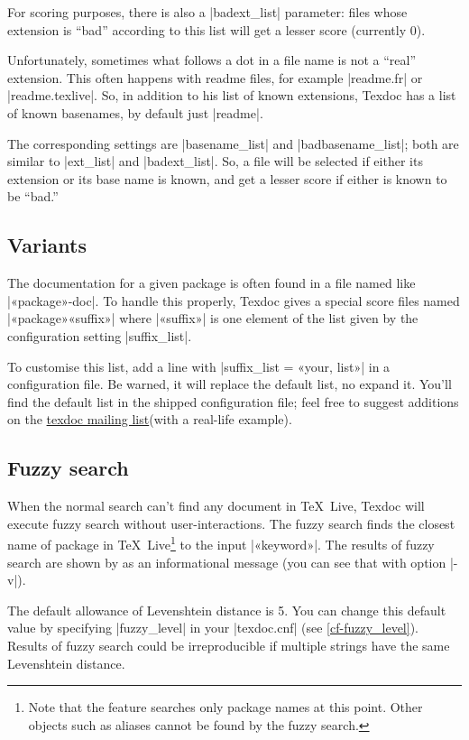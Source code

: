\documentclass[a4paper,oneside]{scrartcl}
\newcommand\texlive{\TeX~Live\xspace}
\newcommand\tdml{\href{http://lists.tug.org/texdoc}{texdoc mailing list}\xspace}
\begin{document}
For scoring purposes, there is also a |badext_list| parameter: files whose
extension is ``bad'' according to this list will get a lesser score (currently
0).

Unfortunately, sometimes what follows a dot in a file name is not a ``real''
extension. This often happens with readme files, for example |readme.fr| or
|readme.texlive|. So, in addition to his list of known extensions, Texdoc has
a list of known basenames, by default just |readme|.

The corresponding settings are |basename_list| and |badbasename_list|; both
are similar to |ext_list| and |badext_list|. So, a file will be selected if
either its extension or its base name is known, and get a lesser score if
either is known to be ``bad.''

\subsection{Variants}\label{ss-variants}

The documentation for a given package is often found in a file named like
|«package»-doc|. To handle this properly, Texdoc gives a special score files
named |«package»«suffix»| where |«suffix»| is one element of the list given by
the configuration setting |suffix_list|.

To customise this list, add a line with |suffix_list = «your, list»| in a
configuration file. Be warned, it will replace the default list, no expand
it. You'll find the default list in the shipped configuration file; feel free
to suggest additions on the \tdml (with a real-life example).

\subsection{Fuzzy search}\label{ss-fuzzy}

When the normal search can't find any document in {\texlive}, Texdoc will
execute fuzzy search without user-interactions. The fuzzy search finds the
closest name of package in {\texlive}\footnote{Note that the feature searches
only package names at this point. Other objects such as aliases cannot be found
by the fuzzy search.} to the input |«keyword»|. The results of fuzzy search are
shown by as an informational message (you can see that with option |-v|).

The default allowance of Levenshtein distance is 5. You can change this default
value by specifying |fuzzy_level| in your |texdoc.cnf| (see
\ref{cf-fuzzy_level}). Results of fuzzy search could be irreproducible if
multiple strings have the same Levenshtein distance.
\end{document}
